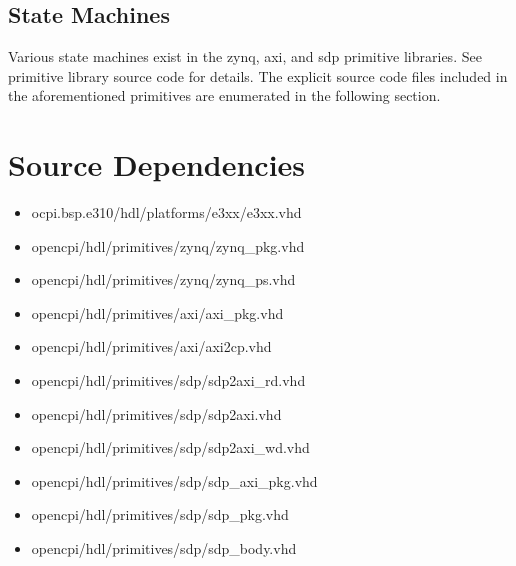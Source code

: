 \documentclass{article}
\begin{document}
\subsection*{State Machines}
Various state machines exist in the zynq, axi, and sdp primitive libraries. See primitive library source code for details. The explicit source code files included in the aforementioned primitives are enumerated in the following section.

\newpage
\section*{Source Dependencies}
\begin{itemize}
	\item
ocpi.bsp.e310/hdl/platforms/e3xx/e3xx.vhd
	\item
opencpi/hdl/primitives/zynq/zynq\_pkg.vhd
	\item
opencpi/hdl/primitives/zynq/zynq\_ps.vhd
	\item
opencpi/hdl/primitives/axi/axi\_pkg.vhd
	\item
opencpi/hdl/primitives/axi/axi2cp.vhd
	\item
opencpi/hdl/primitives/sdp/sdp2axi\_rd.vhd
	\item
opencpi/hdl/primitives/sdp/sdp2axi.vhd
	\item
opencpi/hdl/primitives/sdp/sdp2axi\_wd.vhd
	\item
opencpi/hdl/primitives/sdp/sdp\_axi\_pkg.vhd
	\item
opencpi/hdl/primitives/sdp/sdp\_pkg.vhd
	\item
opencpi/hdl/primitives/sdp/sdp\_body.vhd
\end{itemize}
\end{document}
